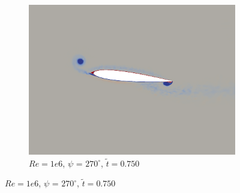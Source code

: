 \begin{figure}[H]
\begin{subfigure}[b]{0.32\textwidth}
		\centering
		\includegraphics[width=1\textwidth]{figures/Vorticity_plots/Re_1m_1pt2/phase_270.png}
		\caption{$Re=1e6$, $\psi$ = $270^\circ$, $\tilde{t}=0.750$}
		\label{fig:Re_1m_1pt2_phi270}
	\end{subfigure}
	

\end{figure}
